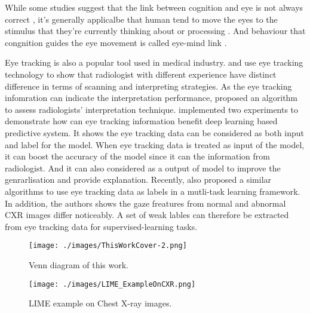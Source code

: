 While some studies suggest that the link between cognition and eye is not always correct \citep{Anderson2004EyeMovementNegativeSupport, Schall2014EyeTrackingIntro}, it's generally applicalbe that human tend to move the eyes to the stimulus that they're currently thinking about or processing \citep{Cater2020BestPracticeEyeTracking}. And behaviour that congnition guides the eye movement is called eye-mind link \citep{Reichle2012EyeMindLink1, Reichle2010EyeMindLink2}.

Eye tracking is also a popular tool used in medical industry. \citet{Manning2003ExpreienceRadiologist} and \citet{Nicholas2015PassingGlance} use eye tracking technology to show that radiologist with different experience have distinct difference in terms of scanning and interpreting strategies. As the eye tracking infomration can indicate the interpretation performance, \citep{McLaughlin2017EvaluateRadiologistPeformanceLevel} proposed an algorithm to assess radiologists' interpretation technique. \citet{Karargyris2021EyeGazePaper} implemented two experiments to demonstrate how can eye tracking information benefit deep learning based predictive system. It shows the eye tracking data can be considered as both input and label for the model. When eye tracking data is treated as input of the model, it can boost the accuracy of the model since it can the information from radiologist. And it can also considered as a output of model to improve the genrarlisation and provide explanation. Recently, \citep{Saab2021EyeTrackingCXRClassification} also proposed a similar algorithms to use eye tracking data as labels in a mutli-task learning framework. In addition, the authors shows the gaze freatures from normal and abnormal CXR images differ noticeably. A set of weak lables can therefore be extracted from eye tracking data for supervised-learning tasks.


\begin{figure}[!h]
    \centering
    \texttt{[image: ./images/ThisWorkCover-2.png]}
    \caption{Venn diagram of this work.}
    \label{fig: this_work_cover}
\end{figure}

\begin{figure}[!h]
    \centering
    \texttt{[image: ./images/LIME\_ExampleOnCXR.png]}
    \caption{LIME example on Chest X-ray images. \citep{Teixeira2021LIMEAndGradCAMOnCXR}}
    \label{fig: LIME_ExampleOnCXR}
\end{figure}

